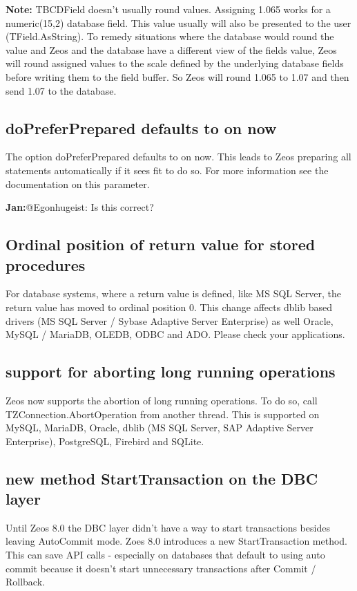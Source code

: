 \documentclass[a4paper,12pt,oneside]{article}
\begin{document}
\textbf{Note:}
TBCDField doesn't usually round values.
Assigning 1.065 works for a numeric(15,2) database field.
This value usually will also be presented to the user (TField.AsString).
To remedy situations where the database would round the value and Zeos and the database have a different view of the fields value, Zeos will round assigned values to the scale defined by the underlying database fields before writing them to the field buffer.
So Zeos will round 1.065 to 1.07 and then send 1.07 to the database.

\subsection{doPreferPrepared defaults to on now}
The option doPreferPrepared defaults to on now.
This leads to Zeos preparing all statements automatically if it sees fit to do so.
For more information see the documentation on this parameter.

\textbf{Jan:}@Egonhugeist: Is this correct?

\subsection{Ordinal position of return value for stored procedures}
For database systems, where a return value is defined, like MS SQL Server, the return value has moved to ordinal position 0.
This change affects dblib based drivers (MS SQL Server / Sybase Adaptive Server Enterprise) as well Oracle, MySQL / MariaDB, OLEDB, ODBC and ADO.
Please check your applications.

\subsection{support for aborting long running operations}
Zeos now supports the abortion of long running operations.
To do so, call TZConnection.AbortOperation from another thread.
This is supported on MySQL, MariaDB, Oracle, dblib (MS SQL Server, SAP Adaptive Server Enterprise), PostgreSQL, Firebird and SQLite.

\subsection{new method StartTransaction on the DBC layer}
Until Zeos 8.0 the DBC layer didn't have a way to start transactions besides leaving AutoCommit mode.
Zoes 8.0 introduces a new StartTransaction method.
This can save API calls - especially on databases that default to using auto commit because it doesn't start unnecessary transactions after Commit / Rollback.
\end{document}
